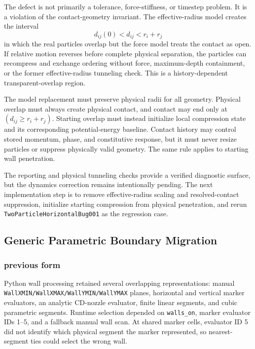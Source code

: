 The defect is not primarily a tolerance, force-stiffness, or timestep problem.
It is a violation of the contact-geometry invariant.  The effective-radius
model creates the interval
\begin{equation}
d_{ij}(0)<d_{ij}<r_i+r_j
\end{equation}
in which the real particles overlap but the force model treats the contact as
open.  If relative motion reverses before complete physical separation, the
particles can recompress and exchange ordering without force, maximum-depth
containment, or the former effective-radius tunneling check.  This is a
history-dependent transparent-overlap region.

The model replacement must preserve physical radii for all geometry.  Physical
overlap must always create physical contact, and contact may end only at
$(d_{ij}\ge r_i+r_j)$.  Starting overlap must instead initialize local
compression state and its corresponding potential-energy baseline.  Contact
history may control stored momentum, phase, and constitutive response, but it
must never resize particles or suppress physically valid geometry.  The same
rule applies to starting wall penetration.

The reporting and physical tunneling checks provide a verified diagnostic
surface, but the dynamics correction remains intentionally pending.  The next
implementation step is to remove effective-radius scaling and resolved-contact
suppression, initialize starting compression from physical penetration, and
rerun \texttt{TwoParticleHorizontalBug001} as the regression case.

\subsection{Generic Parametric Boundary Migration}

\subsubsection{previous form}

Python wall processing retained several overlapping representations: manual
\texttt{WallXMIN/WallXMAX/WallYMIN/WallYMAX} planes, horizontal and vertical
marker evaluators, an analytic CD-nozzle evaluator, finite linear segments,
and cubic parametric segments.  Runtime selection depended on
\texttt{walls\_on}, marker evaluator IDs 1--5, and a fallback manual wall scan.
At shared marker cells, evaluator ID 5 did not identify which physical segment
the marker represented, so nearest-segment ties could select the wrong wall.

